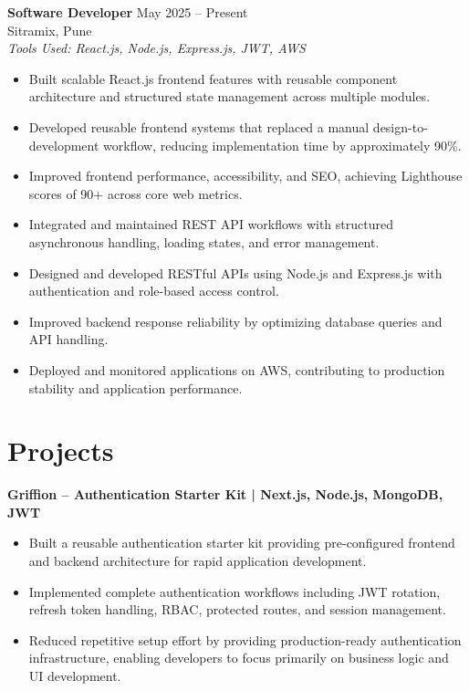 \documentclass[a4paper,10pt]{article}
\begin{document}
    \textbf{Software Developer} \hfill May 2025 -- Present\\
    Sitramix, Pune\\
    \textit{Tools Used: React.js, Node.js, Express.js, JWT, AWS}

    
\begin{itemize}[leftmargin=*]
    \item Built scalable React.js frontend features with reusable component architecture and structured state management across multiple modules.
    
    \item Developed reusable frontend systems that replaced a manual design-to-development workflow, reducing implementation time by approximately 90\%.
    
    \item Improved frontend performance, accessibility, and SEO, achieving Lighthouse scores of 90+ across core web metrics.
    \item Integrated and maintained REST API workflows with structured asynchronous handling, loading states, and error management.
    
    \item Designed and developed RESTful APIs using Node.js and Express.js with authentication and role-based access control.
    
    \item Improved backend response reliability by optimizing database queries and API handling.
    
    \item Deployed and monitored applications on AWS, contributing to production stability and application performance.
\end{itemize}


    \section*{Projects}

\textbf{Griffion -- Authentication Starter Kit | Next.js, Node.js, MongoDB, JWT}

\begin{itemize}[leftmargin=*]
    \item Built a reusable authentication starter kit providing pre-configured frontend and backend architecture for rapid application development.
    
    \item Implemented complete authentication workflows including JWT rotation, refresh token handling, RBAC, protected routes, and session management.
    
    \item Reduced repetitive setup effort by providing production-ready authentication infrastructure, enabling developers to focus primarily on business logic and UI development.
\end{itemize}
\end{document}
